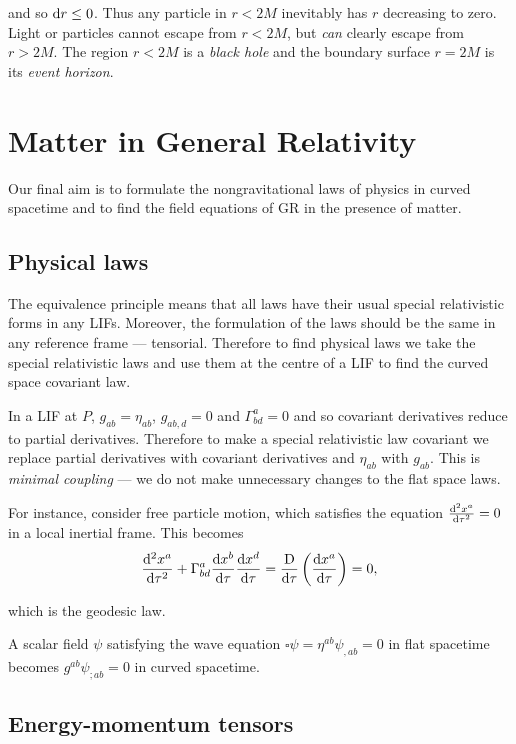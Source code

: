 \documentclass{notes}
\renewcommand{\Box}{\square}
\begin{document}
and so $\mathrm{d} r \le 0$.  Thus any particle in $r < 2 M$ inevitably
has $r$ decreasing to zero. Light or particles cannot escape from
$r < 2M$, but \emph{can} clearly escape from $r > 2 M$.  The
region $r < 2M$ is a \emph{black hole} and the boundary surface
$r = 2 M$ is its \emph{event horizon}.

\chapter{Matter in General Relativity}

Our final aim is to formulate the nongravitational laws of physics in
curved spacetime and to find the field equations of GR in the
presence of matter.

\section{Physical laws}

The equivalence principle means that all laws have their usual special
relativistic forms in any LIFs.  Moreover, the formulation of the laws
should be the same in any reference frame --- tensorial.  Therefore to
find physical laws we take the special relativistic laws and use them
at the centre of a LIF to find the curved space covariant law.

In a LIF at $P$, $g_{a b} = \eta_{a b}$, $g_{a b,d} =
0$ and $\Gamma^a_{b d} = 0$ and so covariant derivatives reduce
to partial derivatives.  Therefore to make a special relativistic law
covariant we replace partial derivatives with covariant derivatives
and $\eta_{a b}$ with $g_{a b}$.  This is \emph{minimal
  coupling} --- we do not make unnecessary changes to the flat space
laws.

For instance, consider free particle motion, which satisfies the
equation $\frac{\mathrm{d}^2 x^a}{\mathrm{d}\tau^2} = 0$ in a local inertial frame.
This becomes
\[
\frac{\mathrm{d}^2 x^a}{\mathrm{d}\tau^2} + \Gamma^a_{b d} \frac{\mathrm{d} x^b}{\mathrm{d}\tau}
\frac{\mathrm{d} x^d}{\mathrm{d}\tau} = \frac{\mathrm{D}}{\mathrm{d} \tau} \left( \frac{\mathrm{d} x^a}{\mathrm{d}\tau}\right)
= 0,
\]

which is the geodesic law.

A scalar field $\psi$ satisfying the wave equation $\Box \psi =
\eta^{a b} \psi_{,a b} = 0$ in flat spacetime becomes $g^{a
  b} \psi_{;a b} = 0$ in curved spacetime.

\section{Energy-momentum tensors}
\end{document}
